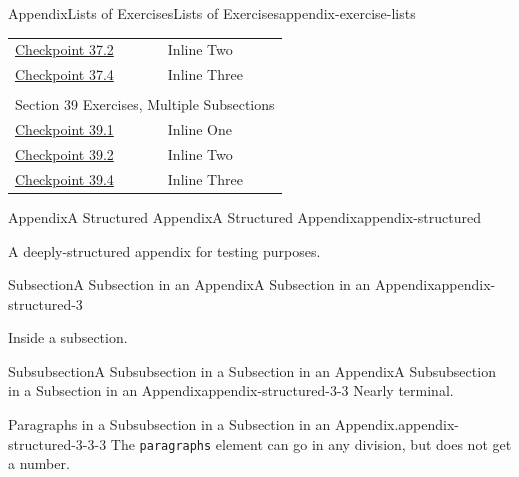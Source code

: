 \documentclass[twoside,10pt,]{article}
\newcommand{\mono}[1]{\texttt{#1}}
\numberwithin{equation}{section}
\begin{document}
\begin{appendixptx}{Appendix}{Lists of Exercises}{}{Lists of Exercises}{}{}{appendix-exercise-lists}
\begin{longtable}[l]{ll}
\hyperref[duplicate-inline]{Checkpoint 37.2}& Inline Two\\
\hyperref[section-exercises-single-9]{Checkpoint 37.4}& Inline Three\\
\multicolumn{2}{l}{\null}\\[1.5ex] \multicolumn{2}{l}{\large Section 39 Exercises, Multiple Subsections}\\[0.5ex]
\hyperref[section-exercises-multiple-3-2]{Checkpoint 39.1}& Inline One\\
\hyperref[section-exercises-multiple-3-4]{Checkpoint 39.2}& Inline Two\\
\hyperref[exercise-duplicate-inline]{Checkpoint 39.4}& Inline Three\\
\end{longtable}
\end{appendixptx}
%
%
\typeout{************************************************}
\typeout{************************************************}
%
\begin{appendixptx}{Appendix}{A Structured Appendix}{}{A Structured Appendix}{}{}{appendix-structured}
\renewcommand*{\appendixname}{Appendix}
\begin{introduction}{}%
A deeply-structured appendix for testing purposes.%
\end{introduction}%
%
%
\typeout{************************************************}
\typeout{************************************************}
%
\begin{subsectionptx}{Subsection}{A Subsection in an Appendix}{}{A Subsection in an Appendix}{}{}{appendix-structured-3}
\begin{introduction}{}%
Inside a subsection.%
\end{introduction}%
%
%
\typeout{************************************************}
\typeout{************************************************}
%
\begin{subsubsectionptx}{Subsubsection}{A Subsubsection in a Subsection in an Appendix}{}{A Subsubsection in a Subsection in an Appendix}{}{}{appendix-structured-3-3}
Nearly terminal.%
\begin{paragraphs}{Paragraphs in a Subsubsection in a Subsection in an Appendix.}{appendix-structured-3-3-3}%
The \mono{paragraphs} element can go in any division, but does not get a number.%
\end{paragraphs}%
\end{subsubsectionptx}
\end{subsectionptx}
\end{appendixptx}
\end{document}

